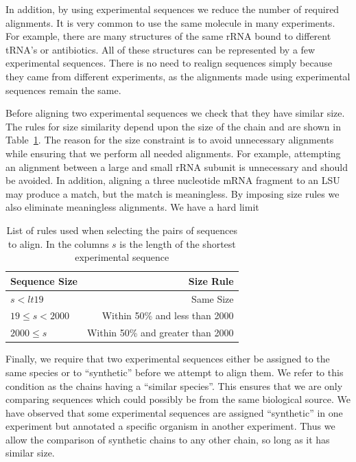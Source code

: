 In addition, by using experimental sequences we reduce the number of required
alignments. It is very common to use the same molecule in many experiments. For
example, there are many structures of the same \EC{} rRNA bound to different
tRNA's or antibiotics. All of these structures can be represented by a few
experimental sequences. There is no need to realign sequences simply because
they came from different experiments, as the alignments made using experimental
sequences remain the same.

Before aligning two experimental sequences we check that they have similar size.
The rules for size similarity depend upon the size of the chain and are shown in
Table~\ref{tab:size-rules}. The reason for the size constraint is to avoid
unnecessary alignments while ensuring that we perform all needed alignments. For
example, attempting an alignment between a large and small rRNA subunit is
unnecessary and should be avoided. In addition, aligning a three nucleotide mRNA
fragment to an LSU may produce a match, but the match is meaningless. By imposing
size rules we also eliminate meaningless alignments. We have a hard limit 

\begin{table}
  \begin{tabular}{lr}
    \toprule
    Sequence Size & Size Rule \\
    \midrule
    $s < lt 19$          & Same Size                         \\
    $19 \leq s < 2000$ & Within 50\% and less than 2000    \\
    $2000 \leq s$        & Within 50\% and greater than 2000 \\
    \bottomrule
  \end{tabular}
  \caption{List of rules used when selecting the pairs of sequences to align. In
  the columns $s$ is the length of the shortest experimental sequence}
\label{tab:size-rules}
\end{table}

Finally, we require that two experimental sequences either be assigned to the
same species or to ``synthetic'' before we attempt to align them. We refer to
this condition as the chains having a ``similar species''. This ensures that we
are only comparing sequences which could possibly be from the same biological
source. We have observed that some experimental sequences are assigned
``synthetic'' in one experiment but annotated a specific organism in another
experiment. Thus we allow the comparison of synthetic chains to any other chain,
so long as it has similar size. 

